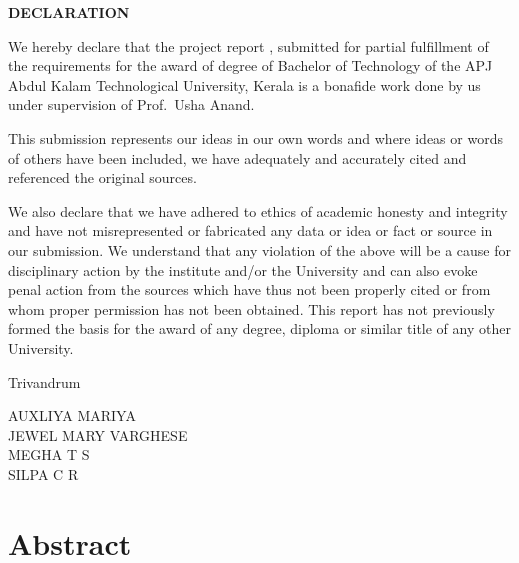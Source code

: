 \newpage
\thispagestyle{empty}
\begin{center}{\bfseries DECLARATION}\end{center}
\vspace{0.3cm}
\noindent
We hereby declare that the project report \textbf{\ReportTitle}, submitted for
partial fulfillment of the requirements for the award of degree of Bachelor of
Technology of the APJ Abdul Kalam Technological University, Kerala is a
bonafide work done by us under supervision of Prof.\ Usha Anand.

This submission represents our ideas in our own words and where ideas or words
of others have been included, we have adequately and accurately cited and
referenced the original sources.

We also declare that we have adhered to ethics of academic honesty and
integrity and have not misrepresented or fabricated any data or idea or fact or
source in our submission. We understand that any violation of the above will be
a cause for disciplinary action by the institute and/or the University and can
also evoke penal action from the sources which have thus not been properly
cited or from whom proper permission has not been obtained. This report has
not previously formed the basis for the award of any degree, diploma or
similar title of any other University.

\vspace{1.2cm}
\noindent Trivandrum\\
\DeclarationDate

\vspace{1.2cm}
\begin{flushright}
AUXLIYA MARIYA\\[4pt]
JEWEL MARY VARGHESE\\[4pt]
MEGHA T S\\[4pt]
SILPA C R
\end{flushright}

\clearpage
{}
\setcounter{page}{1}
\chapter*{Abstract}

